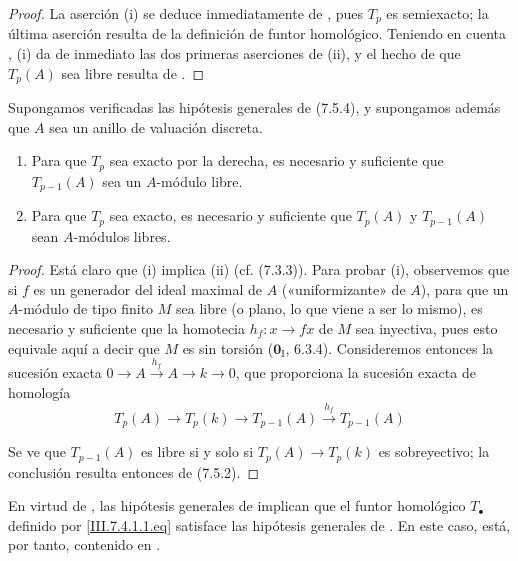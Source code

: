 \begin{proof}
La aserción (i) se deduce inmediatamente de , pues
$T_p$ es semiexacto; la última aserción resulta de la definición de
funtor homológico. Teniendo en cuenta , (i) da de
inmediato las dos primeras aserciones de (ii), y el hecho de que
$T_p(A)$ sea libre resulta de .
\end{proof}

\begin{corollary}[7.5.6]
Supongamos verificadas las hipótesis generales de \textup{(7.5.4)}, y supongamos además
que $A$ sea un anillo de valuación discreta.
\begin{enumerate}
  \item[\textup{(i)}] Para que $T_p$ sea exacto por la derecha, es necesario y suficiente que
    $T_{p-1}(A)$ sea un $A$-módulo libre.
  \item[\textup{(ii)}] Para que $T_p$ sea exacto, es necesario y suficiente que $T_p(A)$ y
    $T_{p-1}(A)$ sean $A$-módulos libres.
\end{enumerate}
\end{corollary}

\begin{proof}
Está claro que (i) implica (ii) (cf. (7.3.3)). Para probar (i), observemos
que si $f$ es un generador del ideal maximal de $A$ («uniformizante» de
$A$), para que un $A$-módulo de tipo finito $M$ sea libre (o plano, lo que viene
a ser lo mismo), es necesario y suficiente que la homotecia $h_f:x\to fx$ de $M$ sea
inyectiva, pues esto equivale aquí a decir que $M$ es sin torsión
($\mathbf{0}_{\mathrm I}$, 6.3.4). Consideremos entonces la sucesión exacta
$0\longrightarrow A\xrightarrow{h_f}A\longrightarrow k\longrightarrow0$,
que proporciona la sucesión exacta de homología
\[
  T_p(A)
  \longrightarrow T_p(k)
  \longrightarrow T_{p-1}(A)
  \xrightarrow{h_f}T_{p-1}(A)
\]

Se ve que $T_{p-1}(A)$ es libre si y solo si
$T_p(A)\to T_p(k)$ es sobreyectivo; la conclusión resulta entonces de (7.5.2).
\end{proof}

\begin{remark}[7.5.7]
\label{III.7.5.7}
En virtud de , las hipótesis generales de
 implican que el funtor homológico $T_\bullet$
definido por \eqref{III.7.4.1.1.eq} satisface las hipótesis generales
de . En este caso,  está, por tanto,
contenido en .
\end{remark}
